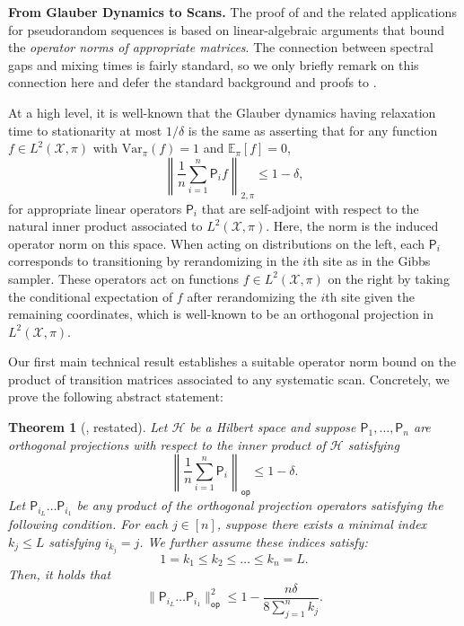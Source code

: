 \documentclass[11pt]{article}
\newtheorem{theorem}{Theorem}[section]
\begin{document}
\noindent \textbf{From Glauber Dynamics to  Scans.}
The proof of  and the related applications for pseudorandom sequences is based on linear-algebraic arguments that bound the \emph{operator norms of appropriate matrices}. The connection between spectral gaps and mixing times is fairly standard, so we only briefly remark on this connection here and defer the standard background and proofs to . 

At a high level, it is well-known that the Glauber dynamics having relaxation time to stationarity at most $1/\delta$ is the same as asserting that for any function $f\in L^2(\mathcal{X},\pi)$ with $\text{Var}_{\pi}(f)=1$ and $\mathbb{E}_{\pi}[f]=0$,
\begin{equation*}
    \left\|\frac{1}{n}\sum_{i=1}^n \mathsf{P}_i f\right\|_{2,\pi}\leq 1-\delta,
\end{equation*}
for appropriate linear operators $\mathsf{P}_i$ that are self-adjoint with respect to the natural inner product associated to $ L^2(\mathcal{X},\pi)$. Here, the norm is the induced operator norm on this space. When acting on distributions on the left, each $\mathsf{P}_i$ corresponds to transitioning by rerandomizing in the $i$th site as in the Gibbs sampler. These operators act on functions $f\in L^2(\mathcal{X},\pi)$ on the right by taking the conditional expectation of $f$ after rerandomizing the $i$th site given the remaining coordinates, which is well-known to be an orthogonal projection in $L^2(\mathcal{X},\pi)$. 

Our first main technical result establishes a suitable operator norm bound on the product of transition matrices associated to any systematic scan. Concretely, we prove the following abstract statement:

\begin{theorem}
[, restated]
\label{thm:gap_intro}
        Let $\mathcal{H}$ be a Hilbert space and suppose $\mathsf{P}_1,\ldots, \mathsf{P}_n$ are orthogonal projections with respect to the inner product of $\mathcal{H}$ satisfying
        \begin{equation}
    \left\|\frac{1}{n}\sum_{i=1}^n \mathsf{P}_i\right\|_{\mathsf{op}}\leq 1-\delta.
\end{equation} 
Let $\mathsf{P}_{i_L}\ldots \mathsf{P}_{i_1}$ be any product of the orthogonal projection operators satisfying the following condition. For each $j\in [n]$, suppose there exists a minimal index $k_j\leq L$ satisfying $i_{k_j}=j$. We further assume these indices satisfy:
\begin{equation}
\label{eq:order}
        1=k_1\leq k_2\leq\ldots\leq k_n=L.
\end{equation}
Then, it holds that
\begin{equation*}
    \|\mathsf{P}_{i_L}\ldots \mathsf{P}_{i_1}\|_{\mathsf{op}}^2\leq 1-\frac{n\delta}{8\sum_{j=1}^n k_j}.
\end{equation*}
\end{theorem}
\end{document}
